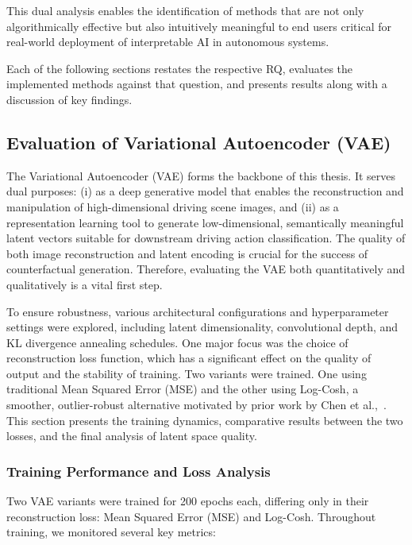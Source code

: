     This dual analysis enables the identification of methods that are not only algorithmically effective but also intuitively meaningful to end users critical for real-world deployment of interpretable AI in autonomous systems.
    


Each of the following sections restates the respective RQ, evaluates the implemented methods against that question, and presents results along with a discussion of key findings.


\subsection{Evaluation of Variational Autoencoder (VAE)} \label{subsec:vae_evaluation}

The Variational Autoencoder (VAE) forms the backbone of this thesis. It serves dual purposes: (i) as a deep generative model that enables the reconstruction and manipulation of high-dimensional driving scene images, and (ii) as a representation learning tool to generate low-dimensional, semantically meaningful latent vectors suitable for downstream driving action classification. The quality of both image reconstruction and latent encoding is crucial for the success of counterfactual generation. Therefore, evaluating the VAE both quantitatively and qualitatively is a vital first step.

To ensure robustness, various architectural configurations and hyperparameter settings were explored, including latent dimensionality, convolutional depth, and KL divergence annealing schedules. One major focus was the choice of reconstruction loss function, which has a significant effect on the quality of output and the stability of training. Two variants were trained. One using traditional Mean Squared Error (MSE) and the other using Log-Cosh, a smoother, outlier-robust alternative motivated by prior work by Chen et al.,~\cite{chen2019log}. This section presents the training dynamics, comparative results between the two losses, and the final analysis of latent space quality.

\subsubsection{Training Performance and Loss Analysis} \label{subsubsec:vae_training_loss}

Two VAE variants were trained for 200 epochs each, differing only in their reconstruction loss: Mean Squared Error (MSE) and Log-Cosh. Throughout training, we monitored several key metrics:

